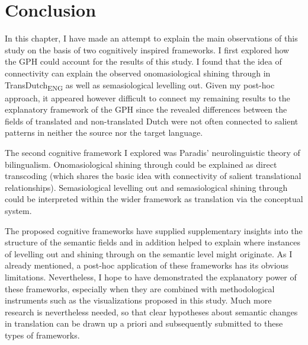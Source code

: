 \section{Conclusion}
\label{sec:5.4}  
In this chapter, I have made an attempt to explain the main observations of this study on the basis of two cognitively inspired frameworks. I first explored how the GPH could account for the results of this study. I found that the idea of connectivity can explain the observed onomasiological shining through in TransDutch\textsubscript{ENG} as well as semasiological levelling out. Given my post-hoc approach, it appeared however difficult to connect my remaining results to the explanatory framework of the GPH since the revealed differences between the fields of translated and non-translated Dutch were not often connected to salient patterns in neither the source nor the target language.

The second cognitive framework I explored was Paradis’ neurolinguistic theory of bilingualism. Onomasiological shining through could be explained as direct transcoding (which shares the basic idea with connectivity of salient translational relationships). Semasiological levelling out and semasiological shining through could be interpreted within the wider framework as translation via the conceptual system.

The proposed cognitive frameworks have supplied supplementary insights into the structure of the semantic fields and in addition helped to explain where instances of levelling out and shining through on the semantic level might originate. As I already mentioned, a post-hoc application of these frameworks has its obvious limitations. Nevertheless, I hope to have demonstrated the explanatory power of these frameworks, especially when they are combined with methodological instruments such as the visualizations proposed in this study. Much more research is nevertheless needed, so that clear hypotheses about semantic changes in translation can be drawn up a priori and subsequently submitted to these types of frameworks.
